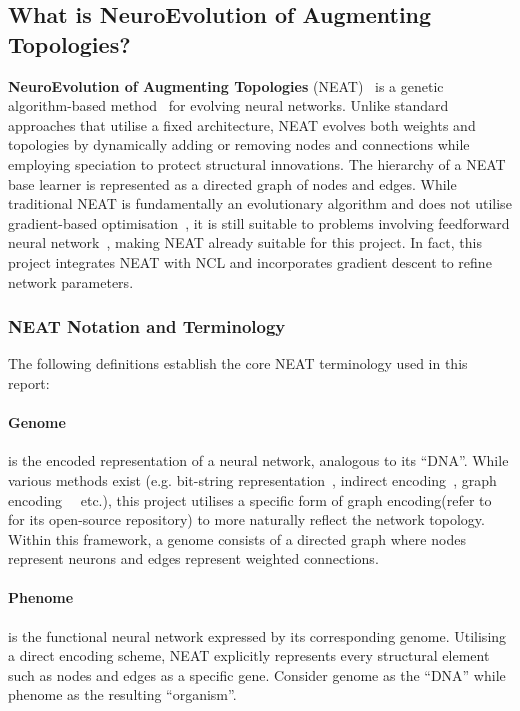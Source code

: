 \subsection{What is NeuroEvolution of Augmenting Topologies? }
\label{subsec:background_neat}
\textbf{NeuroEvolution of Augmenting Topologies} (NEAT)~\cite{stanley2002evolving} is a genetic algorithm-based method~\cite{miller1989designing} for evolving neural networks. Unlike standard approaches that utilise a fixed architecture, NEAT evolves both weights and topologies by dynamically adding or removing nodes and connections while employing speciation to protect structural innovations. The hierarchy of a NEAT base learner is represented as a directed graph of nodes and edges. While traditional NEAT is fundamentally an evolutionary algorithm and does not utilise gradient-based optimisation~\cite{rumelhart1986learning}, it is still suitable to problems involving feedforward neural network~\cite{montana1989training}, making NEAT already suitable for this project. In fact, this project integrates NEAT with NCL and incorporates gradient descent to refine network parameters. 

\subsubsection{NEAT Notation and Terminology}
The following definitions establish the core NEAT terminology used in this report: 

\paragraph{Genome} is the encoded representation of a neural network, analogous to its ``DNA''. While various methods exist (e.g. bit-string representation~\cite{schaffer1992combinations}, indirect encoding~\cite{stanley2009hypercube}, graph encoding~\cite{kitano1990designing}~\cite{pujol1998evolving} etc.), this project utilises a specific form of graph encoding(refer to~\cite{McIntyre_neat-python} for its open-source repository) to more naturally reflect the network topology. Within this framework, a genome consists of a directed graph where nodes represent neurons and edges represent weighted connections. 

\paragraph{Phenome} is the functional neural network expressed by its corresponding genome. Utilising a direct encoding scheme, NEAT explicitly represents every structural element such as nodes and edges as a specific gene. Consider genome as the ``DNA'' while phenome as the resulting ``organism''. 

